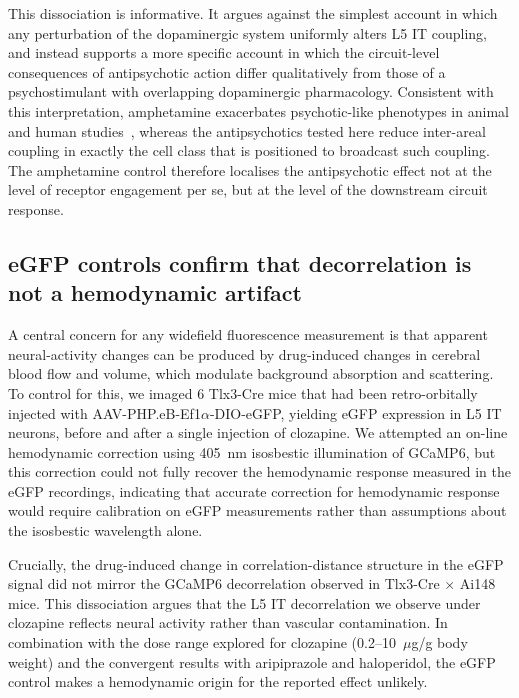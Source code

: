 \documentclass[11pt]{article}
\begin{document}
This dissociation is informative. It argues against the simplest account in which any perturbation of the dopaminergic system uniformly alters L5 IT coupling, and instead supports a more specific account in which the circuit-level consequences of antipsychotic action differ qualitatively from those of a psychostimulant with overlapping dopaminergic pharmacology. Consistent with this interpretation, amphetamine exacerbates psychotic-like phenotypes in animal and human studies~\citep{howes2009dopamine, kambeitz2014alterations}, whereas the antipsychotics tested here reduce inter-areal coupling in exactly the cell class that is positioned to broadcast such coupling. The amphetamine control therefore localises the antipsychotic effect not at the level of receptor engagement per se, but at the level of the downstream circuit response.

\subsection{eGFP controls confirm that decorrelation is not a hemodynamic artifact}

A central concern for any widefield fluorescence measurement is that apparent neural-activity changes can be produced by drug-induced changes in cerebral blood flow and volume, which modulate background absorption and scattering. To control for this, we imaged 6 Tlx3-Cre mice that had been retro-orbitally injected with AAV-PHP.eB-Ef1$\alpha$-DIO-eGFP, yielding eGFP expression in L5 IT neurons, before and after a single injection of clozapine. We attempted an on-line hemodynamic correction using 405~nm isosbestic illumination of GCaMP6, but this correction could not fully recover the hemodynamic response measured in the eGFP recordings, indicating that accurate correction for hemodynamic response would require calibration on eGFP measurements rather than assumptions about the isosbestic wavelength alone.

Crucially, the drug-induced change in correlation-distance structure in the eGFP signal did not mirror the GCaMP6 decorrelation observed in Tlx3-Cre $\times$ Ai148 mice. This dissociation argues that the L5 IT decorrelation we observe under clozapine reflects neural activity rather than vascular contamination. In combination with the dose range explored for clozapine (0.2--10~$\mu$g/g body weight) and the convergent results with aripiprazole and haloperidol, the eGFP control makes a hemodynamic origin for the reported effect unlikely.
\end{document}
